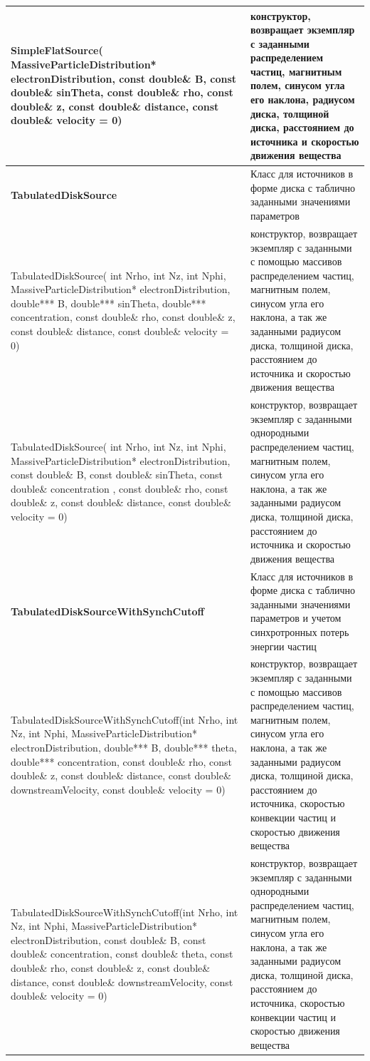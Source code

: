 \begin{small}
\begin{xtabular}{|p{0.5\textwidth}|p{0.5\textwidth}|}
		SimpleFlatSource( MassiveParticleDistribution* electronDistribution, const double\& B, const double\& sinTheta, const double\& rho, const double\& z, const double\& distance, const double\& velocity = 0) & конструктор, возвращает экземпляр с заданными распределением частиц, магнитным полем, синусом угла его наклона, радиусом диска, толщиной диска, расстоянием до источника и скоростью движения вещества\\
		\hline
		\textbf{TabulatedDiskSource} & Класс для источников в форме диска с таблично заданными значениями параметров\\
		\hline
		TabulatedDiskSource( int Nrho, int Nz, int Nphi, MassiveParticleDistribution* electronDistribution, double*** B, double*** sinTheta, double*** concentration, const double\& rho, const double\& z, const double\& distance, const double\& velocity = 0) & конструктор, возвращает экземпляр с заданными с помощью массивов распределением частиц, магнитным полем, синусом угла его наклона, а так же заданными радиусом диска, толщиной диска, расстоянием до источника и скоростью движения вещества\\
		\hline
		TabulatedDiskSource( int Nrho, int Nz, int Nphi, MassiveParticleDistribution* electronDistribution, const double\& B, const double\& sinTheta, const double\& concentration , const double\& rho, const double\& z, const double\& distance, const double\& velocity = 0) & конструктор, возвращает экземпляр с заданными однородными распределением частиц, магнитным полем, синусом угла его наклона, а так же заданными радиусом диска, толщиной диска, расстоянием до источника и скоростью движения вещества\\
		\hline
		\textbf{TabulatedDiskSourceWithSynchCutoff} & Класс для источников в форме диска с таблично заданными значениями параметров и учетом синхротронных потерь энергии частиц\\
		\hline
		TabulatedDiskSourceWithSynchCutoff(int Nrho, int Nz, int Nphi, MassiveParticleDistribution* electronDistribution, double*** B, double*** theta, double*** concentration, const double\& rho, const double\& z, const double\& distance, const double\& downstreamVelocity, const double\& velocity = 0) &
		конструктор, возвращает экземпляр с заданными с помощью массивов распределением частиц, магнитным полем, синусом угла его наклона, а так же заданными радиусом диска, толщиной диска, расстоянием до источника, скоростью конвекции частиц и скоростью движения вещества\\
		\hline
		TabulatedDiskSourceWithSynchCutoff(int Nrho, int Nz, int Nphi, MassiveParticleDistribution* electronDistribution, const double\& B, const double\& concentration, const double\& theta, const double\& rho, const double\& z, const double\& distance, const double\& downstreamVelocity, const double\& velocity = 0) & конструктор, возвращает экземпляр с заданными однородными распределением частиц, магнитным полем, синусом угла его наклона, а так же заданными радиусом диска, толщиной диска, расстоянием до источника, скоростью конвекции частиц и скоростью движения вещества\\

\end{xtabular}
\end{small}
